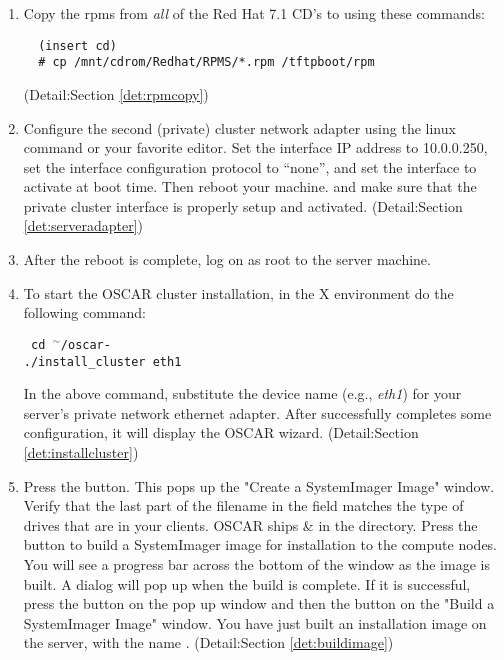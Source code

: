 \begin {enumerate}
Ignore the configure script, it is not used in the installation process
of OSCAR.

(Detail:Section \ref{det:unpack})

\item Copy the rpms from \emph{all} of the Red Hat 7.1 CD's to 
using these commands:

\begin{verbatim}
  (insert cd)
  # cp /mnt/cdrom/Redhat/RPMS/*.rpm /tftpboot/rpm
\end{verbatim}
(Detail:Section \ref{det:rpmcopy})

\item Configure the second (private) cluster network adapter using the linux
 command or your favorite editor. Set the interface 
IP address to 10.0.0.250, set the interface configuration protocol
to ``none'', and set the interface to activate at boot time.
Then reboot your machine. and make sure that the private cluster
interface is properly setup and activated. 
(Detail:Section \ref{det:serveradapter})

\item After the reboot is complete, log on as root to the server 
machine.

\item To start the OSCAR cluster installation,  in the X environment do
the following command:

\vspace{11pt}
{\tt
  cd $^\sim$/oscar-\oscarversion \\
  ./install\_cluster eth1
}
\vspace{11pt}
  
In the above command, substitute the device name 
(e.g., \emph{eth1})
for your server's private network ethernet adapter. After 
successfully completes some configuration, it will display 
the OSCAR wizard.
(Detail:Section \ref{det:installcluster})

\item Press the  button. 
This pops up the "Create a SystemImager Image" window. Verify that the last
part of the filename in the  field matches
the type of drives that are in your clients. OSCAR ships 
\&  in the  directory.
Press the  button to build a SystemImager image for installation to
the compute nodes.  You will see a progress bar across the bottom
of the window as the image is built.  A dialog will pop up when the build is complete. 
If it is successful, press the  button on the pop up window 
and then the  button on the "Build a SystemImager
Image" window. You have just built an installation image on the
server, with the name .
(Detail:Section \ref{det:buildimage})


\end{enumerate}

